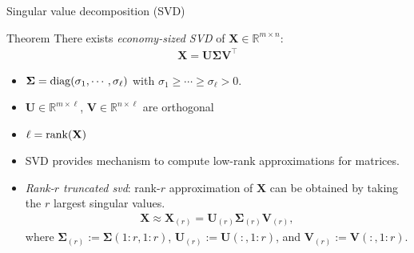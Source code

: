 \documentclass[10pt]{beamer}
\newcommand{\blue}{\color{blue}}
\newcommand{\bX}{\mathbf{X}}
\newcommand{\bS}{\mathbf{\Sigma}}
\newcommand{\bU}{\mathbf{U}}
\newcommand{\bV}{\mathbf{V}}
\newcommand{\rank}{\mathop{\textrm{\textup{rank}}}}
\newcommand{\diag}{\mathop{\textrm{\textup{diag}}}}
\begin{document}
\begin{frame}{Singular value decomposition (SVD)}
  \begin{block}{Theorem}
    There exists {\blue\em economy-sized SVD} of $\bX \in \mathbb{R}^{m\times n }$:
    \begin{align*}
      \bX = \bU \bS \bV^\top
    \end{align*}
    \vspace{-0.2in}
    \begin{itemize}
    \item[\textcolor{black}{\textbullet}]
      $\bS = \diag(\sigma_1,\cdots,\sigma_\ell)$
      with $\sigma_1\geq \cdots\geq \sigma_\ell>0$.
    \item[\textcolor{black}{\textbullet}] $\bU\in\mathbb{R}^{m\times \ell}$, $\bV\in\mathbb{R}^{n\times \ell}$ are orthogonal
    \item[\textcolor{black}{\textbullet}] $\ell=\rank(\bX)$ 
    \end{itemize}
  \end{block}
  \vspace{0.1in}
  \begin{itemize}
\item SVD provides mechanism to compute low-rank approximations for matrices.
  \vspace{0.1in}
  \item {\em\blue Rank-$r$ truncated svd}: rank-$r$ approximation of $\mathbf{X}$ can be obtained by taking the $r$ largest singular values.
    \begin{align*}
      \bX\approx \bX_{(r)}=\bU_{(r)}\bS_{(r)}\bV_{(r)},
    \end{align*}
    where $\bS_{(r)} := \bS(1:r,1:r)$, $\bU_{(r)} := \bU(:,1:r)$, and $\bV_{(r)} := \bV(:,1:r)$.
  \end{itemize}
\end{frame}
\end{document}
